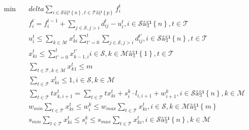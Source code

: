 \begin{align}
  \min\quad & \mathit{delta} \sum_{i \in \mathcal{S} â§¹ \left\{n\right\}, t \in \mathcal{T} â§¹ \left\{p\right\}} f_{i}^{t} \tag{eq\_0001} \\
  & f_{i}^{t} = f_{i}^{t - 1} + \sum_{j \in \mathcal{S} , j > i} d_{\mathit{ij}}^{t} - u_{i}^{t} , i \in \mathcal{S} â§¹ \left\{n\right\} , t \in \mathcal{T} \tag{eq\_0002} \\
  & u_{i}^{t} \leq \sum_{k \in \mathcal{M}} x_{\mathit{ki}}^{t} \sum_{t ' = 0}^{t} \sum_{j \in \mathcal{S} , j > i} d_{\mathit{ij}}^{t '} , i \in \mathcal{S} â§¹ \left\{n\right\} , t \in \mathcal{T} \tag{eq\_0003} \\
  & x_{\mathit{ki}}^{t} \leq \sum_{t ' = 0}^{t} x_{k - 1 , i}^{t '} i \in \mathcal{S} , k \in \mathcal{M} â§¹ \left\{1\right\} , t \in \mathcal{T} \tag{eq\_0004} \\
  & \sum_{t \in \mathcal{T}, k \in \mathcal{M}} x_{k 1}^{t} \leq m \tag{eq\_0005} \\
  & \sum_{t \in \mathcal{T}} x_{\mathit{ki}}^{t} \leq 1 , i \in \mathcal{S} , k \in \mathcal{M} \tag{eq\_0006} \\
  & \sum_{t \in \mathcal{T}} \mathit{tx}_{k , i + 1}^{t} = \sum_{t \in \mathcal{T}} \mathit{tx}_{\mathit{ki}}^{t} + s_{i}^{k} \cdot l_{i , i + 1} + w_{i + 1}^{k} , i \in \mathcal{S} â§¹ \left\{n\right\} , k \in \mathcal{M} \tag{eq\_0007} \\
  & w_{\mathit{min}} \sum_{t \in \mathcal{T}} x_{\mathit{ki}}^{t} \leq w_{i}^{k} \leq w_{\mathit{max}} \sum_{t \in \mathcal{T}} x_{\mathit{ki}}^{t} , i \in \mathcal{S} , k \in \mathcal{M} â§¹ \left\{m\right\} \tag{eq\_0008} \\
  & s_{\mathit{min}} \sum_{t \in \mathcal{T}} x_{\mathit{ki}}^{t} \leq s_{i}^{k} \leq s_{\mathit{max}} \sum_{t \in \mathcal{T}} x_{\mathit{ki}}^{t} , i \in \mathcal{S} â§¹ \left\{n\right\} , k \in \mathcal{M} \tag{eq\_0009} \\

\end{align}
